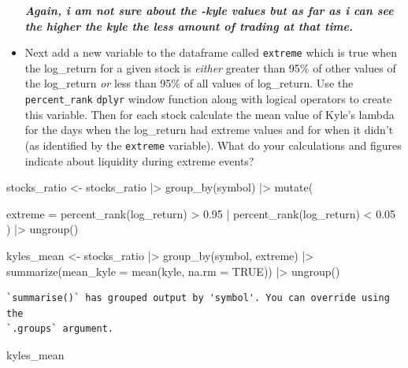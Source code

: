 \documentclass[
  letterpaper,
  DIV=11,
  numbers=noendperiod]{scrartcl}
\newenvironment{Shaded}{\begin{snugshade}}{\end{snugshade}}
\newcommand{\AttributeTok}[1]{\textcolor[rgb]{0.40,0.45,0.13}{#1}}
\newcommand{\ConstantTok}[1]{\textcolor[rgb]{0.56,0.35,0.01}{#1}}
\newcommand{\FloatTok}[1]{\textcolor[rgb]{0.68,0.00,0.00}{#1}}
\newcommand{\FunctionTok}[1]{\textcolor[rgb]{0.28,0.35,0.67}{#1}}
\newcommand{\NormalTok}[1]{\textcolor[rgb]{0.00,0.23,0.31}{#1}}
\newcommand{\OtherTok}[1]{\textcolor[rgb]{0.00,0.23,0.31}{#1}}
\newcommand{\SpecialCharTok}[1]{\textcolor[rgb]{0.37,0.37,0.37}{#1}}
\begin{document}
\begin{itemize}
  \textbf{\emph{Again, i am not sure about the -kyle values but as far
  as i can see the higher the kyle the less amount of trading at that
  time.}}
\item
  Next add a new variable to the dataframe called \texttt{extreme} which
  is true when the log\_return for a given stock is \emph{either}
  greater than 95\% of other values of the log\_return \emph{or} less
  than 95\% of all values of log\_return. Use the \texttt{percent\_rank}
  \texttt{dplyr} window function along with logical operators to create
  this variable. Then for each stock calculate the mean value of Kyle's
  lambda for the days when the log\_return had extreme values and for
  when it didn't (as identified by the \texttt{extreme} variable). What
  do your calculations and figures indicate about liquidity during
  extreme events?
\end{itemize}

\begin{Shaded}
\begin{Highlighting}[]
\NormalTok{stocks\_ratio }\OtherTok{\textless{}{-}}\NormalTok{ stocks\_ratio }\SpecialCharTok{|\textgreater{}} 
  \FunctionTok{group\_by}\NormalTok{(symbol) }\SpecialCharTok{|\textgreater{}} 
  \FunctionTok{mutate}\NormalTok{(}
    
    \AttributeTok{extreme =} \FunctionTok{percent\_rank}\NormalTok{(log\_return) }\SpecialCharTok{\textgreater{}} \FloatTok{0.95} \SpecialCharTok{|} \FunctionTok{percent\_rank}\NormalTok{(log\_return) }\SpecialCharTok{\textless{}} \FloatTok{0.05}
\NormalTok{  ) }\SpecialCharTok{|\textgreater{}}
  \FunctionTok{ungroup}\NormalTok{()}

\NormalTok{kyles\_mean }\OtherTok{\textless{}{-}}\NormalTok{ stocks\_ratio }\SpecialCharTok{|\textgreater{}} 
  \FunctionTok{group\_by}\NormalTok{(symbol, extreme) }\SpecialCharTok{|\textgreater{}} 
  \FunctionTok{summarize}\NormalTok{(}\AttributeTok{mean\_kyle =} \FunctionTok{mean}\NormalTok{(kyle, }\AttributeTok{na.rm =} \ConstantTok{TRUE}\NormalTok{)) }\SpecialCharTok{|\textgreater{}}
  \FunctionTok{ungroup}\NormalTok{()}
\end{Highlighting}
\end{Shaded}

\begin{verbatim}
`summarise()` has grouped output by 'symbol'. You can override using the
`.groups` argument.
\end{verbatim}

\begin{Shaded}
\begin{Highlighting}[]
\NormalTok{kyles\_mean}
\end{Highlighting}
\end{Shaded}
\end{document}
